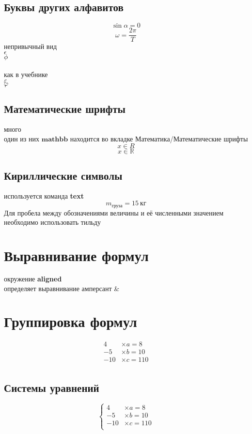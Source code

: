 \documentclass[a4paper,12pt]{article} %
\begin{document}
\subsection{Буквы других алфавитов}
$$ \sin \alpha=0 $$
$$ \omega=\frac{2\pi}{T} $$
непривычный вид\\
$\epsilon$ \\
$\phi$\\\\
как в учебнике\\
$\varepsilon$\\
$\varphi$

\subsection{Математические шрифты}
много\\
один из них $\mathbf{mathbb}$
находится во вкладке Математика/Математические шрифты\\
$$ x \in R $$
$$ x \in \mathbb{R} $$

\subsection{Кириллические символы}
используется команда \textbf{text}
$$ m_{\text{груза}}=15~{\text{кг}} $$
Для пробела между обозначениями величины и её численными значением необходимо использовать тильду

\section{Выравнивание формул}
окружение \textbf{aligned}\\
определяет выравнивание амперсант \&

\section{Группировка формул}
\begin{equation}
\begin{aligned}
4&\times a=8 \\
-5&\times b=10 \\
-10&\times c=110 \\
\end{aligned}
\end{equation}
 
\subsection{Системы уравнений}
$$ \left \{
\begin{aligned}
4&\times a=8 \\
-5&\times b=10 \\
-10&\times c=110 \\
\end{aligned} \right. $$
\end{document}
